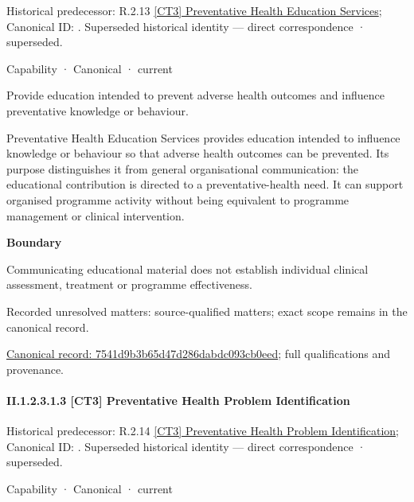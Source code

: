 {\small Historical predecessor: R.2.13 \hyperref[element:dbe10959237f405caeadef2a5748303a]{[CT3] Preventative Health Education Services}; Canonical ID: \texttt{}. Superseded historical identity — direct correspondence · superseded.}\par
\label{element:7541d9b3b65d47d286dabdc093cb0eed}
{\small Capability · Canonical · current}\par

Provide education intended to prevent adverse health outcomes and influence preventative knowledge or behaviour.



Preventative Health Education Services provides education intended to influence knowledge or behaviour so that adverse health outcomes can be prevented. Its purpose distinguishes it from general organisational communication: the educational contribution is directed to a preventative-health need. It can support organised programme activity without being equivalent to programme management or clinical intervention.



\textbf{Boundary}



Communicating educational material does not establish individual clinical assessment, treatment or programme effectiveness.


{\small Recorded unresolved matters: source-qualified matters; exact scope remains in the canonical record.}\par
{\footnotesize \href{../../../../../../../continuum/strategy/capability/7541d9b3b65d47d286dabdc093cb0eed.md}{Canonical record: 7541d9b3b65d47d286dabdc093cb0eed}; full qualifications and provenance.}\par
\paragraph*{II.1.2.3.1.3 [CT3] Preventative Health Problem Identification}
\label{navigation:II.1.2.3.1.3}

{\small Historical predecessor: R.2.14 \hyperref[element:b35d3521141c419fb676a79b2ede40bd]{[CT3] Preventative Health Problem Identification}; Canonical ID: \texttt{}. Superseded historical identity — direct correspondence · superseded.}\par
\label{element:c1567022671f433fa1eeb37a9d156d92}
{\small Capability · Canonical · current}\par

